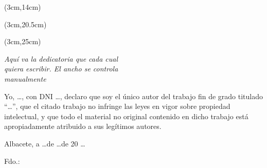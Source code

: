 \begin{textblock*}{\textwidth}(3cm,14cm) 
\begin{center}
{\fontsize{22pt}{4pt}\selectfont \bft{\titulo}}
\end{center}
\end{textblock*}


\begin{textblock*}{\textwidth}(3cm,20.5cm) 
\begin{flushleft}\doublespacing
{\fontsize{14pt}{4pt}\selectfont {} \autor}

{\fontsize{14pt}{4pt}\selectfont {} \director}

\end{flushleft}
\end{textblock*}


\begin{textblock*}{\linewidth}(3cm,25cm) 
\begin{flushright}
{\fontsize{14pt}{4pt}\selectfont \fecha}
\end{flushright}
\end{textblock*}


\cleardoublepage
\thispagestyle{empty}

\vspace*{9cm}  
\begin{flushright} \em 
Aquí va la dedicatoria que cada cual \\ 
quiera escribir. El ancho se controla \\ 
manualmente
\end{flushright}


\cleardoublepage
\thispagestyle{plain}
\begin{center}
\Large{}
\end{center}
\vskip1cm

Yo, \quad \ldots \quad, con DNI \quad \ldots \quad, declaro que soy el único autor del trabajo fin de grado titulado ``\quad \ldots \quad'', que el citado trabajo no infringe las leyes en vigor sobre propiedad intelectual, y que todo el material no original contenido en dicho trabajo está apropiadamente atribuido a sus legítimos autores.

\vspace*{2cm}
\begin{center}
Albacete, a \quad \ldots \quad de \quad \ldots \quad de 20 \ldots

\vskip3cm

Fdo.: \autor
\end{center}


